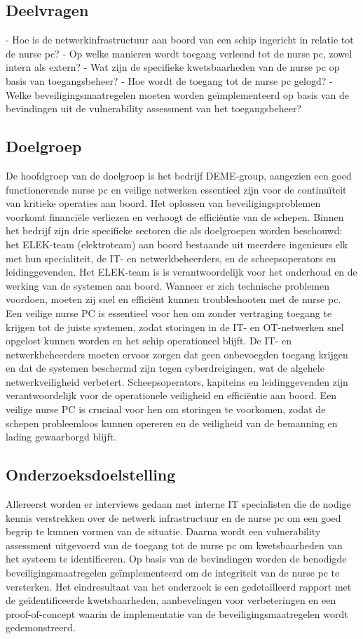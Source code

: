 \subsection{Deelvragen}
- Hoe is de netwerkinfrastructuur aan boord van een schip ingericht in relatie tot de nurse pc?
- Op welke manieren wordt toegang verleend tot de nurse pc, zowel intern als extern?
- Wat zijn de specifieke kwetsbaarheden van de nurse pc op basis van toegangsbeheer?
- Hoe wordt de toegang tot de nurse pc gelogd?
- Welke beveiligingsmaatregelen moeten worden geïmplementeerd op basis van de bevindingen uit de vulnerability assessment van het toegangsbeheer?


\subsection{Doelgroep}
De hoofdgroep van de doelgroep is het bedrijf DEME-group, aangezien een goed functionerende nurse pc en veilige netwerken 
essentieel zijn voor de continuïteit van kritieke operaties aan boord. Het oplossen van beveiligingsproblemen voorkomt financiële verliezen en verhoogt de efficiëntie van de schepen.
Binnen het bedrijf zijn drie specifieke sectoren die als doelgroepen worden beschouwd: het ELEK-team (elektroteam) aan boord bestaande uit meerdere ingenieurs elk met hun specialiteit, de IT- en netwerkbeheerders, en de scheepsoperators en leidinggevenden.
Het ELEK-team is is verantwoordelijk voor het onderhoud en de werking van de systemen aan boord. Wanneer er zich technische problemen voordoen, moeten zij snel en efficiënt kunnen troubleshooten met de nurse pc.
Een veilige nurse PC is essentieel voor hen om zonder vertraging toegang te krijgen tot de juiste systemen, zodat storingen in de IT- en OT-netwerken snel opgelost kunnen worden en het schip operationeel blijft.
De IT- en netwerkbeheerders moeten ervoor zorgen dat geen onbevoegden toegang krijgen en dat de systemen beschermd zijn tegen cyberdreigingen, wat de algehele netwerkveiligheid verbetert.
Scheepsoperators, kapiteins en leidinggevenden zijn verantwoordelijk voor de operationele veiligheid en efficiëntie aan boord. Een veilige nurse PC is cruciaal voor hen om storingen te voorkomen, zodat de schepen probleemloos kunnen opereren en de 
veiligheid van de bemanning en lading gewaarborgd blijft.

\subsection{Onderzoeksdoelstelling}
Allereerst worden er interviews gedaan met interne IT specialisten die de nodige kennis verstrekken over de netwerk infrastructuur en de nurse pc om een goed begrip te kunnen vormen van de situatie. 
Daarna wordt een vulnerability assessment uitgevoerd van de toegang tot de nurse pc om kwetsbaarheden van het systeem te identificeren. 
Op basis van de bevindingen worden de benodigde beveiligingsmaatregelen geïmplementeerd om de integriteit van de nurse pc te versterken.
Het eindresultaat van het onderzoek is een gedetailleerd rapport met de geïdentificeerde kwetsbaarheden, aanbevelingen voor verbeteringen en een proof-of-concept 
waarin de implementatie van de beveiligingsmaatregelen wordt gedemonstreerd.



